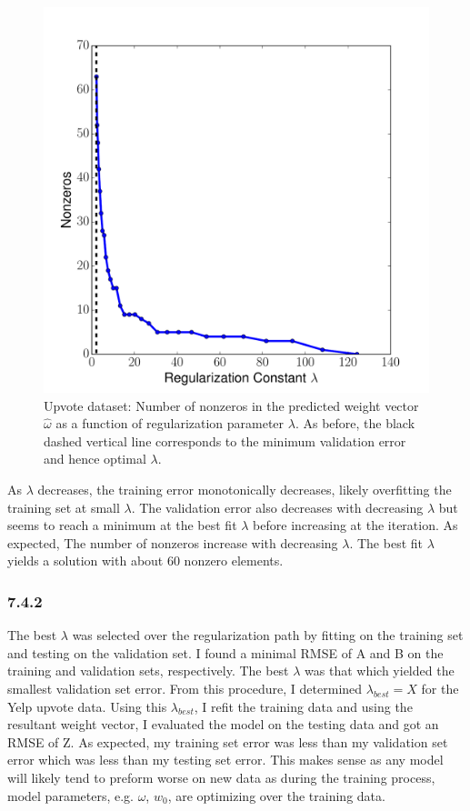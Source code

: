 \documentclass[12pt]{amsart}
\begin{document}
\begin{figure}
	\includegraphics[width=\columnwidth]{upvote_nonzeros.pdf}
    \caption{Upvote dataset: Number of nonzeros in the predicted weight vector $\hat{\omega}$ as a function of regularization parameter $\lambda$.  As before, the black dashed vertical line corresponds to the minimum validation error and hence optimal $\lambda$.}
    \label{fig:yelp_upvote_nonzeros}
\end{figure}

As $\lambda$ decreases, the training error monotonically decreases, likely overfitting the training set at small $\lambda$.  The validation error also decreases with decreasing $\lambda$ but seems to reach a minimum at the best fit $\lambda$ before increasing at the iteration.  As expected, The number of nonzeros increase with decreasing $\lambda$.  The best fit $\lambda$ yields a solution with about 60 nonzero elements.

\subsubsection*{7.4.2}

The best $\lambda$ was selected over the regularization path by fitting on the training set and testing on the validation set.  I found a minimal RMSE of A and B on the training and validation sets, respectively.  The best $\lambda$ was that which yielded the smallest validation set error.  From this procedure, I determined $\lambda_{best} = X$ for the Yelp upvote data.  Using this $\lambda_{best}$, I refit the training data and using the resultant weight vector, I evaluated the model on the testing data and got an RMSE of Z.  As expected, my training set error was less than my validation set error which was less than my testing set error.  This makes sense as any model will likely tend to preform worse on new data as during the training process, model parameters, e.g. $\omega$, $w_0$, are optimizing over the training data.
\end{document}
